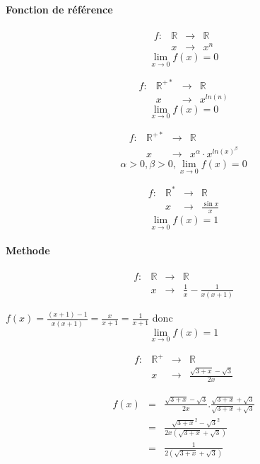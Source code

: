 \paragraph{Fonction de référence}
\begin{align*}
	f: &\mathbb{R} &\rightarrow &\mathbb{R} \\
	& x & \rightarrow &x^n 
\end{align*}
\[\lim_{x \to 0} f(x) = 0\]


\begin{align*}
	f: &\mathbb{R}^{+*} &\rightarrow &\mathbb{R} \\
	   & x & \rightarrow &x^{ln(n)} 
\end{align*}
\[\lim_{x \to 0} f(x) = 0\]

\begin{align*}
	f: &\mathbb{R}^{+*} &\rightarrow &\mathbb{R} \\
	   & x & \rightarrow &x^{\alpha} \cdot x^{ln(x)^\beta}
\end{align*}
\[\alpha >0, \beta>0, \lim_{x \to 0} f(x) = 0\]

\begin{align*}
	f: &\mathbb{R}^* &\rightarrow &\mathbb{R} \\
	   & x & \rightarrow &\frac{\sin{x}}{x}
\end{align*}
\[\lim_{x \to 0} f(x) = 1\]

\paragraph{Methode}
\begin{align*}
	f:&\mathbb{R} &\rightarrow &\mathbb{R}\\
	  &x& \rightarrow & \frac{1}{x} - \frac{1}{x(x+1)}
\end{align*}

$f(x) = \frac{(x+1)-1}{x(x+1)} = \frac{x}{x+1} = \frac{1}{x+1}$
donc \[\lim_{x \to 0}f(x) = 1\]

\begin{align*}
	f:&\mathbb{R}^+ &\rightarrow &\mathbb{R}\\
	  &x& \rightarrow & \frac{\sqrt{3+x} - \sqrt{3}}{2x}
\end{align*}

\begin{align*}
	f(x) &=& \frac{\sqrt{3+x} - \sqrt{3}}{2x} . \frac{\sqrt{3+x} + \sqrt{3}}{\sqrt{3+x} + \sqrt{3}} \\
			   &=& \frac{\sqrt{3+x}^2 - \sqrt{3}^2}{2x(\sqrt{3+x} + \sqrt{3})} \\
			   &=& \frac{1}{2(\sqrt{3+x}+\sqrt{3})}
\end{align*}

